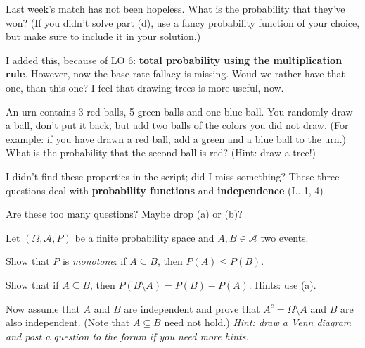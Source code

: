 \documentclass[a4paper,10pt,landscape,twocolumn]{scrartcl}
\begin{document}
\begin{exercise}[Hospitals (4pt)]
	\begin{subex}[1pt]
		Last week's match has not been hopeless. What is the probability that they've won? (If you didn't solve part (d), use a fancy probability function of your choice, but make sure to include it in your solution.)
	\end{subex}


\end{exercise}

\begin{exercise}
\begin{mycomment}
	I added this, because of LO 6: \textbf{total probability using the multiplication rule}. However, now the base-rate fallacy is missing. Woud we rather have that one, than this one? I feel that drawing trees is more useful, now.
\end{mycomment}

An urn contains 3 red balls, 5 green balls and one blue ball. You randomly draw a ball, don't put it back, but add two balls of the colors you did not draw. (For example: if you have drawn a red ball, add a green and a blue ball to the urn.) What is the probability that the second ball is red? (Hint: draw a tree!)
\end{exercise}

\begin{exercise}
	\begin{mycomment}
		I didn't find these properties in the script; did I miss something? These three questions deal with \textbf{probability functions} and \textbf{independence} (L. 1, 4)
		
		Are these too many questions? Maybe drop (a) or (b)?
	\end{mycomment}

	Let $(\Omega, \mathcal{A}, P)$ be a finite probability space and $A, B\in \mathcal A$ two events.
	\begin{subex}[1pt]
		Show that $P$ is \emph{monotone}: if $A \subseteq B$, then $P(A) \le P(B)$. 
	\end{subex}
	
	\begin{subex}[1pt]
		Show that if $A \subseteq B$, then $P(B \setminus A) = P(B) - P(A)$. Hints: use (a).
	\end{subex}
	
	\begin{subex}[1pt]
		Now assume that $A$ and $B$ are independent and prove that $A^c = \Omega\setminus A$ and $B$ are also independent. (Note that $A\subseteq B$ need not hold.) \emph{Hint: draw a Venn diagram and post a question to the forum if you need more hints.} 
	\end{subex}
\end{exercise}
\end{document}
